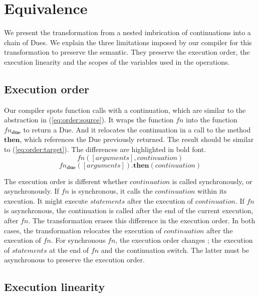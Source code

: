 \section{Equivalence} \label{section:equivalence}

We present the transformation from a nested imbrication of continuations into a chain of Dues.
We explain the three limitations imposed by our compiler for this transformation to preserve the semantic.
They preserve the execution order, the execution linearity and the scopes of the variables used in the operations.

\subsection{Execution order}

Our compiler spots function calls with a continuation, which are similar to the abstraction in (\ref{eq:order:source}).
It wraps the function $fn$ into the function $fn_\textbf{due}$ to return a Due.
And it relocates the continuation in a call to the method $\textbf{then}$, which references the Due previously returned.
The result should be similar to (\ref{eq:order:target}).
The differences are highlighted in bold font.
\begin{equation} \label{eq:order:source}
fn([arguments], continuation)
\end{equation}
\begin{equation} \label{eq:order:target}
fn_\textbf{due}([arguments])\textbf{.then}(continuation)
\end{equation}

The execution order is different whether $continuation$ is called synchronously, or asynchronously.
If $fn$ is synchronous, it calls the $continuation$ within its execution.
It might execute $statements$ after the execution of $continuation$.
If $fn$ is asynchronous, the continuation is called after the end of the current execution, after $fn$.
The transformation erases this difference in the execution order.
In both cases, the transformation relocates the execution of $continuation$ after the execution of $fn$.
For synchronous $fn$, the execution order changes ; the execution of $statements$ at the end of $fn$ and the continuation switch.
The latter must be asynchronous to preserve the execution order.

\subsection{Execution linearity}

